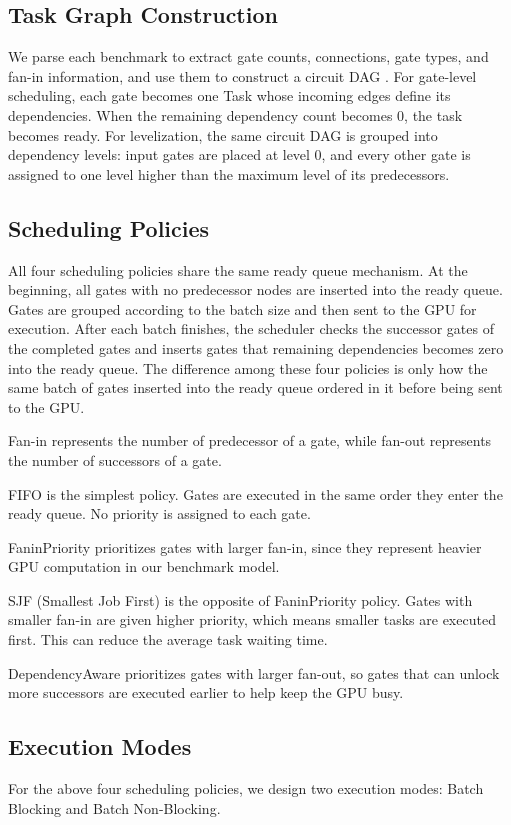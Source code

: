 \documentclass[sigconf,screen,nonacm]{acmart}
\begin{document}
    \subsection{Task Graph Construction}
   We parse each benchmark to extract gate counts, connections, gate types, and fan-in information, and use them to construct a circuit DAG \cite{lsim}. For gate-level scheduling, each gate becomes one Task whose incoming edges define its dependencies. When the remaining dependency count becomes 0, the task becomes ready.
   For levelization, the same circuit DAG is grouped into dependency levels: input gates are placed at level 0, and every other gate is assigned to one level higher than the maximum level of its predecessors.
    \subsection{Scheduling Policies}
    All four scheduling policies share the same ready queue mechanism. At the beginning, all gates with no predecessor nodes are inserted into the ready queue. Gates are grouped according to the batch size and then sent to the GPU for execution. After each batch finishes, the scheduler checks the successor gates of the completed gates and inserts gates that remaining dependencies becomes zero into the ready queue. The difference among these four policies is only how the same batch of gates inserted into the ready queue ordered in it before being sent to the GPU. 

    Fan-in represents the number of predecessor of a gate, while fan-out represents the number of successors of a gate.
    
    FIFO is the simplest policy. Gates are executed in the same order they enter the ready queue. No priority is assigned to each gate.
    
    FaninPriority prioritizes gates with larger fan-in, since they represent heavier GPU computation in our benchmark model.
    
    SJF (Smallest Job First) is the opposite of FaninPriority policy. Gates with smaller fan-in are given higher priority, which means smaller tasks are executed first. This can reduce the average task waiting time.
    
    DependencyAware prioritizes gates with larger fan-out, so gates that can unlock more successors are executed earlier to help keep the GPU busy.

    \subsection{Execution Modes}
        For the above four scheduling policies, we design two execution modes: Batch Blocking and Batch Non-Blocking.
\end{document}
